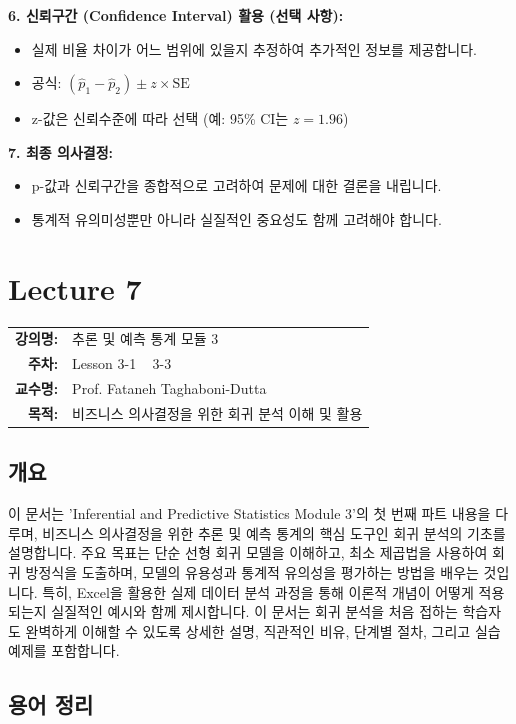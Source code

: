 \documentclass[11pt,a4paper]{book}
\makeatletter
\theoremstyle{definition}
\newcommand{\metainfo}[4]{
\begin{tcolorbox}[
    colback=lightpurple,
    colframe=darkpurple,
    boxrule=1pt,
    arc=2mm,
    left=10pt,
    right=10pt,
    top=8pt,
    bottom=8pt
]
\begin{tabular}{@{}rl@{}}
\textbf{강의명:} & #1 \\[0.3em]
\textbf{주차:} & #2 \\[0.3em]
\textbf{교수명:} & #3 \\[0.3em]
\textbf{목적:} & \begin{minipage}[t]{0.75\textwidth}#4\end{minipage}
\end{tabular}
\end{tcolorbox}
}
\makeatother
\begin{document}
\begin{summarybox}[title=\textbf{두 표본 비율 검정 핵심 요약}]
\textbf{6. 신뢰구간 (Confidence Interval) 활용 (선택 사항):}
\begin{itemize}
    \item 실제 비율 차이가 어느 범위에 있을지 추정하여 추가적인 정보를 제공합니다.
    \item 공식: $(\hat{p}_1 - \hat{p}_2) \pm z \times \text{SE}$
    \item z-값은 신뢰수준에 따라 선택 (예: 95\% CI는 $z=1.96$)
\end{itemize}

\textbf{7. 최종 의사결정:}
\begin{itemize}
    \item p-값과 신뢰구간을 종합적으로 고려하여 문제에 대한 결론을 내립니다.
    \item 통계적 유의미성뿐만 아니라 실질적인 중요성도 함께 고려해야 합니다.
\end{itemize}
\end{summarybox}


\chapter{Lecture 7}
\label{ch:module7}

\metainfo{추론 및 예측 통계 모듈 3}{Lesson 3-1 ~ 3-3}{Prof. Fataneh Taghaboni-Dutta}{비즈니스 의사결정을 위한 회귀 분석 이해 및 활용}


\section{개요}

이 문서는 'Inferential and Predictive Statistics Module 3'의 첫 번째 파트 내용을 다루며, 비즈니스 의사결정을 위한 추론 및 예측 통계의 핵심 도구인 회귀 분석의 기초를 설명합니다.
주요 목표는 단순 선형 회귀 모델을 이해하고, 최소 제곱법을 사용하여 회귀 방정식을 도출하며, 모델의 유용성과 통계적 유의성을 평가하는 방법을 배우는 것입니다.
특히, Excel을 활용한 실제 데이터 분석 과정을 통해 이론적 개념이 어떻게 적용되는지 실질적인 예시와 함께 제시합니다.
이 문서는 회귀 분석을 처음 접하는 학습자도 완벽하게 이해할 수 있도록 상세한 설명, 직관적인 비유, 단계별 절차, 그리고 실습 예제를 포함합니다.


\section{용어 정리}
\end{document}
